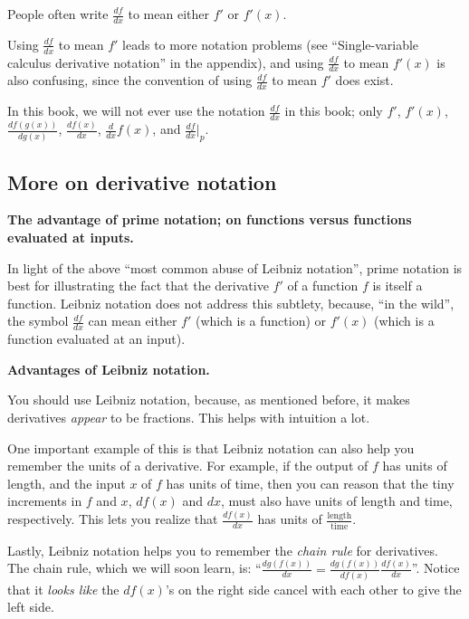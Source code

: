 People often write $\frac{df}{dx}$ to mean either $f'$ or $f'(x)$. 

Using $\frac{df}{dx}$ to mean $f'$ leads to more notation problems (see ``Single-variable calculus derivative notation'' in the appendix), and using $\frac{df}{dx}$ to mean $f'(x)$ is also confusing, since the convention of using $\frac{df}{dx}$ to mean $f'$ does exist.

In this book, we will not ever use the notation $\frac{df}{dx}$ in this book; only $f'$, $f'(x)$, $\frac{df(g(x))}{dg(x)}$, $\frac{df(x)}{dx}$, $\frac{d}{dx}f(x)$, and $\frac{df}{dx}\Big|_p$.

\subsection*{More on derivative notation}

\indent \textbf{The advantage of prime notation; on functions versus functions evaluated at inputs.} 
         
In light of the above ``most common abuse of Leibniz notation'', prime notation is best for illustrating the fact that the derivative $f'$ of a function $f$ is itself a function. Leibniz notation does not address this subtlety, because, ``in the wild'', the symbol $\frac{df}{dx}$ can mean either $f'$ (which is a function) or $f'(x)$ (which is a function evaluated at an input).

\vspace{.5cm}

\textbf{Advantages of Leibniz notation.} 
         
You should use Leibniz notation, because, as mentioned before, it makes derivatives \textit{appear} to be fractions. This helps with intuition a lot.
         
One important example of this is that Leibniz notation can also help you remember the units of a derivative. For example, if the output of $f$ has units of length, and the input $x$ of $f$ has units of time, then you can reason that the tiny increments in $f$ and $x$, $df(x)$ and $dx$, must also have units of length and time, respectively. This lets you realize that $\frac{df(x)}{dx}$ has units of $\frac{\text{length}}{\text{time}}$.
         
Lastly, Leibniz notation helps you to remember the \textit{chain rule} for derivatives. The chain rule, which we will soon learn, is: ``$\frac{dg(f(x))}{dx} = \frac{dg(f(x))}{df(x)} \frac{df(x)}{dx}$''. Notice that it \textit{looks like} the $df(x)$'s on the right side cancel with each other to give the left side.
         
